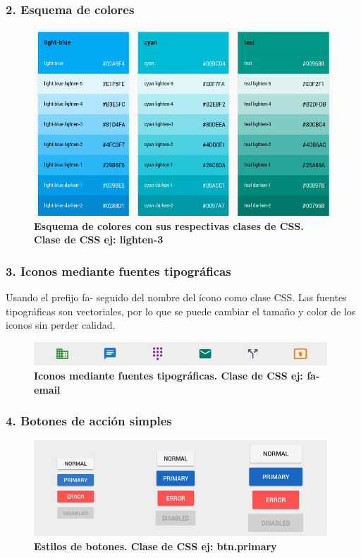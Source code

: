 \subsubsection{2. Esquema de colores}
\begin{figure}[h]
    \includegraphics[width=12cm]{Img/UX/guia0.jpg}
    \centering
    \caption{\textbf{ \footnotesize{Esquema de colores con sus respectivas clases de CSS. Clase de CSS ej: lighten-3}}}
\end{figure}


\subsubsection{3. Iconos mediante fuentes tipográficas}
    Usando el prefijo fa- seguido del nombre del ícono como clase CSS. Las fuentes tipográficas son vectoriales, por lo que se puede cambiar el tamaño y color de los iconos sin perder calidad.
    \begin{figure}[h]
    \includegraphics[width=11cm]{Img/UX/guia3.jpg}
    \centering
    \caption{\textbf{ \footnotesize{Iconos mediante fuentes tipográficas. Clase de CSS ej: fa-email}}}
   
    \end{figure}
    
 
\subsubsection{4. Botones de acción simples}
    \begin{figure}[h]
    \includegraphics[width=11cm]{Img/UX/guia2.jpg}
    \centering
    \caption{\textbf{ \footnotesize{Estilos de botones. Clase de CSS ej: btn.primary}}}
    \end{figure}
    
